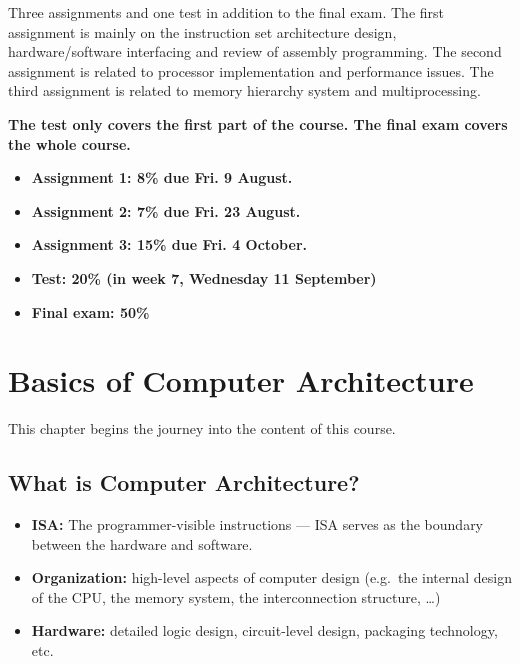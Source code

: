 \documentclass[
  12pt,
  a4paper,
]{report}
\begin{document}
Three assignments and one test in addition to the final exam. The first
assignment is mainly on the instruction set architecture design,
hardware/software interfacing and review of assembly programming. The
second assignment is related to processor implementation and performance
issues. The third assignment is related to memory hierarchy system and
multiprocessing.

\textbf{The test only covers the first part of the course. The final
exam covers the whole course.}

\begin{itemize}
\item
  \textbf{Assignment 1: 8\% due Fri. 9 August.}
\item
  \textbf{Assignment 2: 7\% due Fri. 23 August.}
\item
  \textbf{Assignment 3: 15\% due Fri. 4 October.}
\item
  \textbf{Test: 20\% (in week 7, Wednesday 11 September)}
\item
  \textbf{Final exam: 50\%}
\end{itemize}

\chapter{Basics of Computer
Architecture}\label{basics-of-computer-architecture}

\label{02BasicsComputerArch}
This chapter begins the journey into the content of this course.

\label{WhatIsComputerArchitecture}
\section{What is Computer
Architecture?}\label{what-is-computer-architecture}

\begin{itemize}
\item
  \textbf{ISA:} The programmer-visible instructions --- ISA serves as
  the boundary between the hardware and software.
\item
  \textbf{Organization:} high-level aspects of computer design (e.g.~the
  internal design of the CPU, the memory system, the interconnection
  structure, \ldots)
\item
  \textbf{Hardware:} detailed logic design, circuit-level design,
  packaging technology, etc.
\end{itemize}

\label{ReviewMemOrg}
\end{document}
